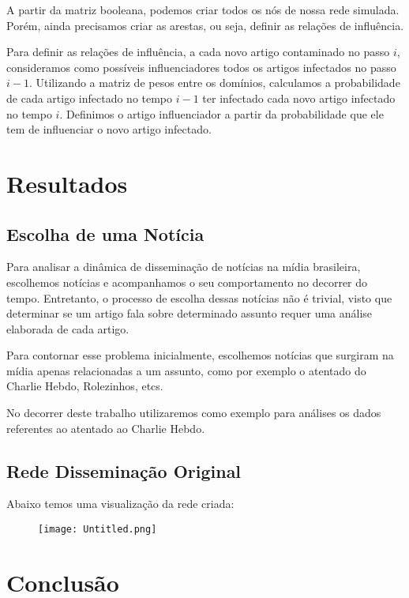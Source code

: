 \documentclass[a4paper,12pt]{article}
\begin{document}
  A partir da matriz booleana, podemos criar todos os nós de nossa rede simulada. Porém, ainda precisamos criar as arestas, ou seja, definir
  as relações de influência. 
  
  Para definir as relações de influência, a cada novo artigo contaminado no passo $i$, consideramos como possíveis influenciadores todos os artigos
  infectados no passo $i-1$. Utilizando a matriz de pesos entre os domínios, calculamos a probabilidade de cada artigo infectado no tempo
  $i-1$ ter infectado cada novo artigo infectado no tempo $i$. Definimos o artigo influenciador a partir da probabilidade que ele tem de 
  influenciar o novo artigo infectado. 

\section{Resultados}
 

\subsection{Escolha de uma Notícia}

Para analisar a dinâmica de disseminação de notícias na mídia brasileira, escolhemos notícias e acompanhamos o seu comportamento no decorrer 
do tempo.
Entretanto, o processo de escolha dessas notícias não é trivial, visto que determinar se um artigo fala sobre determinado assunto requer
uma análise elaborada de cada artigo.

Para contornar esse problema inicialmente, escolhemos notícias que surgiram na mídia apenas relacionadas a um assunto, como por exemplo o atentado
do Charlie Hebdo, Rolezinhos, etcs.

No decorrer deste trabalho utilizaremos como exemplo para análises os dados referentes ao atentado ao Charlie Hebdo.
  

  \pagebreak

\subsection{Rede Disseminação Original}

Abaixo temos uma visualização da
 rede criada:

 \begin{figure}[h]
 \centering
 \texttt{[image: Untitled.png]}
\end{figure}


\section{Conclusão}
\end{document}
